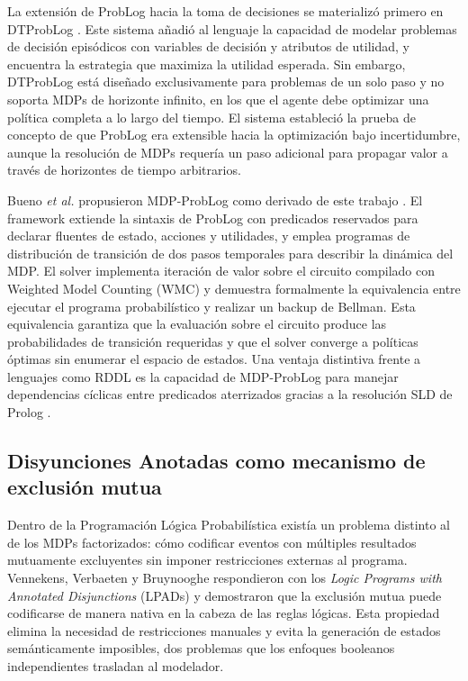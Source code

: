 La extensión de ProbLog hacia la toma de decisiones se materializó primero en DTProbLog \cite{vandenbroeck2010dtproblog}. Este sistema añadió al lenguaje la capacidad de modelar problemas de decisión episódicos con variables de decisión y atributos de utilidad, y encuentra la estrategia que maximiza la utilidad esperada. Sin embargo, DTProbLog está diseñado exclusivamente para problemas de un solo paso y no soporta MDPs de horizonte infinito, en los que el agente debe optimizar una política completa a lo largo del tiempo. El sistema estableció la prueba de concepto de que ProbLog era extensible hacia la optimización bajo incertidumbre, aunque la resolución de MDPs requería un paso adicional para propagar valor a través de horizontes de tiempo arbitrarios.


Bueno \textit{et al.} propusieron MDP-ProbLog como derivado de este trabajo \cite{bueno2016mdp}. El framework extiende la sintaxis de ProbLog con predicados reservados para declarar fluentes de estado, acciones y utilidades, y emplea programas de distribución de transición de dos pasos temporales para describir la dinámica del MDP. El solver implementa iteración de valor sobre el circuito compilado con Weighted Model Counting (WMC) y demuestra formalmente la equivalencia entre ejecutar el programa probabilístico y realizar un backup de Bellman. Esta equivalencia garantiza que la evaluación sobre el circuito produce las probabilidades de transición requeridas y que el solver converge a políticas óptimas sin enumerar el espacio de estados. Una ventaja distintiva frente a lenguajes como RDDL es la capacidad de MDP-ProbLog para manejar dependencias cíclicas entre predicados aterrizados gracias a la resolución SLD de Prolog \cite{bueno2016mdp}.

\subsection{Disyunciones Anotadas como mecanismo de exclusión mutua}
\label{sec:ea-ads-compilacion}
\label{sec:ea-ads}

Dentro de la Programación Lógica Probabilística existía un problema distinto al de los MDPs factorizados: cómo codificar eventos con múltiples resultados mutuamente excluyentes sin imponer restricciones externas al programa. Vennekens, Verbaeten y Bruynooghe respondieron con los \textit{Logic Programs with Annotated Disjunctions} (LPADs) \cite{vennekens2004lpads} y demostraron que la exclusión mutua puede codificarse de manera nativa en la cabeza de las reglas lógicas. Esta propiedad elimina la necesidad de restricciones manuales y evita la generación de estados semánticamente imposibles, dos problemas que los enfoques booleanos independientes trasladan al modelador.


